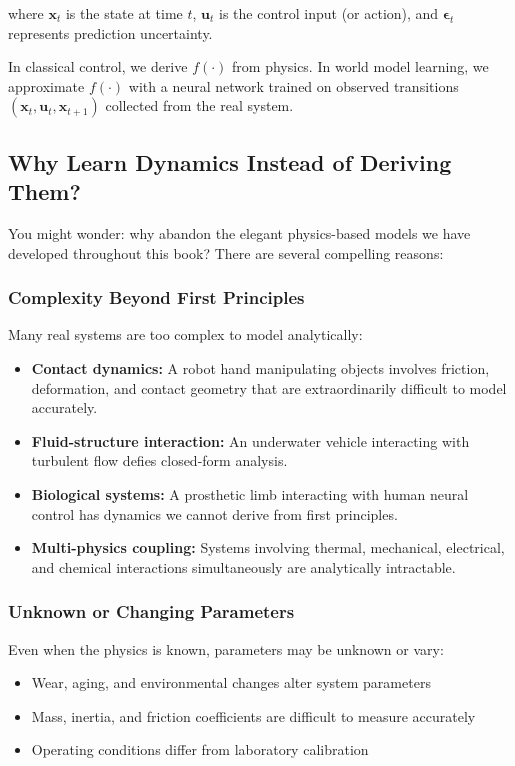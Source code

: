 where $\mathbf{x}_t$ is the state at time $t$, $\mathbf{u}_t$ is the control input (or action), and $\boldsymbol{\epsilon}_t$ represents prediction uncertainty.

In classical control, we derive $f(\cdot)$ from physics. In world model learning, we approximate $f(\cdot)$ with a neural network trained on observed transitions $(\mathbf{x}_t, \mathbf{u}_t, \mathbf{x}_{t+1})$ collected from the real system.

\subsection{Why Learn Dynamics Instead of Deriving Them?}

You might wonder: why abandon the elegant physics-based models we have developed throughout this book? There are several compelling reasons:

\subsubsection{Complexity Beyond First Principles}

Many real systems are too complex to model analytically:
\begin{itemize}
    \item \textbf{Contact dynamics:} A robot hand manipulating objects involves friction, deformation, and contact geometry that are extraordinarily difficult to model accurately.
    \item \textbf{Fluid-structure interaction:} An underwater vehicle interacting with turbulent flow defies closed-form analysis.
    \item \textbf{Biological systems:} A prosthetic limb interacting with human neural control has dynamics we cannot derive from first principles.
    \item \textbf{Multi-physics coupling:} Systems involving thermal, mechanical, electrical, and chemical interactions simultaneously are analytically intractable.
\end{itemize}

\subsubsection{Unknown or Changing Parameters}

Even when the physics is known, parameters may be unknown or vary:
\begin{itemize}
    \item Wear, aging, and environmental changes alter system parameters
    \item Mass, inertia, and friction coefficients are difficult to measure accurately
    \item Operating conditions differ from laboratory calibration
\end{itemize}

